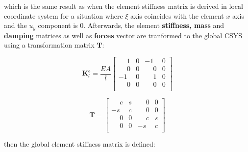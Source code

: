 \documentclass[10pt,b5paper,titlepage]{book}
\newcommand{\m}{\mathbf}
\begin{document}
which is the same result as when the element stiffness matrix is derived
in local coordinate system for a situation where $ \xi $ axis coincides with
the element $ x $ axis and the $ u_y $ component is $ 0 $. Afterwards,
the element \textbf{stiffness, mass} and \textbf{damping} matrices as well as
\textbf{forces} vector are tranformed to the global CSYS using a transformation
matrix $ \m{T} $:

\begin{equation}
    \m{K}_l^e = \frac{EA}{l}
    \begin{bmatrix}
        \phantom{-}1 & 0 & -1 & 0 \\
        \phantom{-}0 & 0 & \phantom{-}0 & 0 \\
        -1 & 0 & \phantom{-}1 & 0 \\
        \phantom{-}0 & 0 & \phantom{-}0 & 0 \\
    \end{bmatrix}
\end{equation}

\begin{equation}
    \m{T} = \begin{bmatrix}
        \phantom{-}c & s & \phantom{-}0 & 0 \\
        -s & c & \phantom{-}0 & 0 \\
        \phantom{-}0 & 0 & \phantom{-}c & s \\
        \phantom{-}0 & 0 & -s & c \\
    \end{bmatrix}
\end{equation}

then the global element stiffness matrix is defined:
\end{document}
